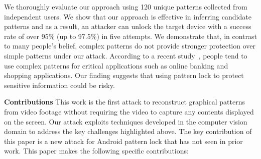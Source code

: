 We thoroughly evaluate our approach using 120 unique patterns collected from independent users. We show that our approach is effective in inferring candidate patterns and as a result, an attacker can unlock
the target device with a success rate of over 95\% (up to 97.5\%) in five attempts.
We demonstrate that, in contrast to many people's belief, complex patterns do not provide stronger protection over simple patterns under our attack. According to a recent study~\cite{alpnorway}, people tend to use complex
patterns for critical applications such as online banking and shopping applications.
Our finding suggests that using pattern lock to protect sensitive information could be risky.
%

\noindent \textbf{Contributions} This work is the first attack to reconstruct graphical patterns from video footage without requiring the video to capture any contents displayed on the screen.
Our attack exploits techniques developed in the computer vision domain to address the key challenges highlighted above.
The key contribution of this paper is a new attack for Android pattern lock that has not seen in prior work. This paper makes the following specific contributions:

